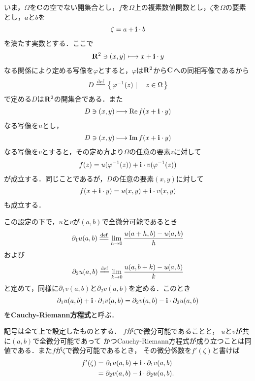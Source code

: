 	いま，$\Omega$を$\mathbf{C}$の空でない開集合とし，$f$を$\Omega$上の複素数値関数とし，$\zeta$を$\Omega$の要素とし，$a$と$b$を
	\begin{align}
		\zeta = a + \mathbf{i} \cdot b
	\end{align}
	を満たす実数とする．ここで
	\begin{align}
		\mathbf{R}^2 \ni (x,y) \longmapsto x + \mathbf{i} \cdot y
	\end{align}
	なる関係により定める写像を$\varphi$とすると，$\varphi$は$\mathbf{R}^2$から$\mathbf{C}$への同相写像であるから
	\begin{align}
		D \defeq \Set{\varphi^{-1}(z)}{z \in \Omega}
	\end{align}
	で定める$D$は$\mathbf{R}^2$の開集合である．また
	\begin{align}
		D \ni (x,y) \longmapsto \operatorname{Re} f(x + \mathbf{i} \cdot y)
	\end{align}
	なる写像を$u$とし，
	\begin{align}
		D \ni (x,y) \longmapsto \operatorname{Im} f(x + \mathbf{i} \cdot y)
	\end{align}
	なる写像を$v$とすると，その定め方より$\Omega$の任意の要素$z$に対して
	\begin{align}
		f(z) = u(\varphi^{-1}(z)) + \mathbf{i} \cdot v(\varphi^{-1}(z))
	\end{align}
	が成立する．同じことであるが，$D$の任意の要素$(x,y)$に対して
	\begin{align}
		f(x + \mathbf{i} \cdot y) = u(x,y) + \mathbf{i} \cdot v(x,y)
	\end{align}
	も成立する．
	
	この設定の下で，$u$と$v$が$(a,b)$で全微分可能であるとき
	\begin{align}
		\partial_1 u(a,b) \defeq \lim_{h \to 0} \frac{u(a+h,b) - u(a,b)}{h}
	\end{align}
	および
	\begin{align}
		\partial_2 u(a,b) \defeq \lim_{k \to 0} \frac{u(a,b+k) - u(a,b)}{k}
	\end{align}
	と定めて，同様に$\partial_1 v(a,b)$と$\partial_2 v(a,b)$を定める．このとき
	\begin{align}
		\partial_1 u(a,b) + \mathbf{i} \cdot \partial_1 v(a,b)
		= \partial_2 v(a,b) - \mathbf{i} \cdot \partial_2 u(a,b)
	\end{align}
	を{\bf Cauchy-Riemann方程式}と呼ぶ．
	
	\begin{screen}
		\begin{thm}
		\label{thm:differentiable_iff_Cauchy_Riemann_equation_holds}
			記号は全て上で設定したものとする．
			$f$が$\zeta$で微分可能であることと，
			$u$と$v$が共に$(a,b)$で全微分可能であって
			かつCauchy-Riemann方程式が成り立つことは同値である．また$f$が$\zeta$で微分可能であるとき，
			その微分係数を$f'(\zeta)$と書けば
			\begin{align}
				f'(\zeta) &= \partial_1 u(a,b) + \mathbf{i} \cdot \partial_1 v(a,b) \\
				&= \partial_2 v(a,b) - \mathbf{i} \cdot \partial_2 u(a,b).
			\end{align}
		\end{thm}
	\end{screen}
	
